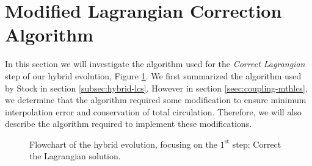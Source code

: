%		 
%	 
%	 
%	 
%	 
%	 
	


\section{Modified Lagrangian Correction Algorithm}
\label{sec:coupling-mlca}


	In this section we will investigate the algorithm used for the \textit{Correct Lagrangian} step of our hybrid evolution, Figure \ref{fig:flowchart_simpleCoupling_correction}. We first summarized the algorithm used by Stock \cite{Stock2010a} in section \ref{subsec:hybrid-lcs}. However in section \ref{seec:coupling-mthlcs}, we determine that the algorithm required some modification to ensure minimum interpolation error and conservation of total circulation. Therefore, we will also describe the algorithm required to implement these modifications.
	
		\begin{figure}[H]
			\centering
			\caption{Flowchart of the hybrid evolution, focusing on the $1^{\mathrm{st}}$ step: Correct the Lagrangian solution.}
			\label{fig:flowchart_simpleCoupling_correction}
		\end{figure}
		
